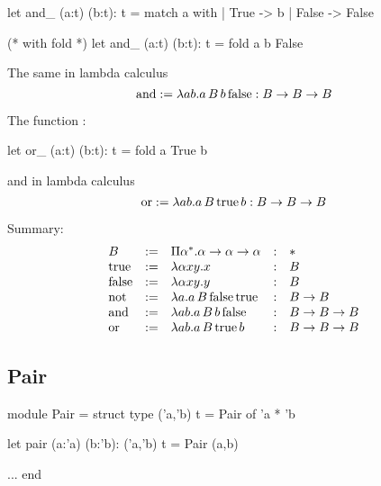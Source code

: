 \begin{ocaml}
  let and_ (a:t) (b:t): t =
    match a with
    | True -> b
    | False -> False

  (* with fold *)
  let and_ (a:t) (b:t): t =
    fold a b False
\end{ocaml}

The same in lambda calculus
$$
\text{and}
:=
\lambda a b. a\, B\, b\, \text{false}
: B \to B \to B
$$


The function :
\begin{ocaml}
  let or_ (a:t) (b:t): t =
    fold a True b
\end{ocaml}
%
and in lambda calculus
$$
\text{or}
:= \lambda a b. a\, B\, \text{true}\, b
: B \to B \to B
$$



Summary:
$$
%
\begin{array}{lllll}
  \Bool
  &:=& \Pi \alpha^* . \alpha\to\alpha\to\alpha
  &:& *

  \\

  \true
  &:=& \lambda \alpha x y . x
  &:& \Bool

  \\

  \false
  &:=& \lambda \alpha x y . y
  &:& \Bool

  \\

  \text{not}
  &:=&
    \lambda a. a\, \Bool\, \false\, \true
  &:& \Bool \to \Bool

  \\

  \andb
  &:=&
    \lambda a b. a\, \Bool\, b\, \false
  &:& \Bool \to \Bool \to \Bool

  \\

  \orb
  &:=&
    \lambda a b. a\, \Bool\, \true\, b
  &:& \Bool \to \Bool \to \Bool
\end{array}
$$



\subsection{Pair}

\begin{ocaml}
  module Pair =
    struct
      type ('a,'b) t = Pair of 'a * 'b

      let pair (a:'a) (b:'b): ('a,'b) t =
        Pair (a,b)

      ...
    end
\end{ocaml}

